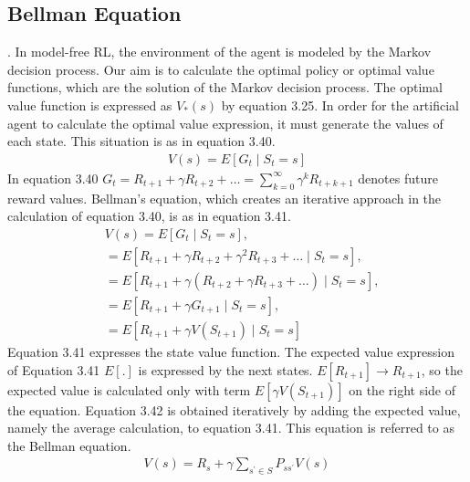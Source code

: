 \documentclass[12pt,twoside,a4]{mwbk}
\begin{document}
\subsection{Bellman Equation}.
In model-free RL, the environment of the agent is modeled by the Markov decision process. Our aim is to calculate the optimal policy or optimal value functions, which are the solution of the Markov decision process. The optimal value function is expressed as $V_{*}(s)$ by equation 3.25. In order for the artificial agent to calculate the optimal value expression, it must generate the values of each state. This situation is as in equation 3.40.
\begin{subequations}
\begin{align}
   V(s)=E\left[G_{t} \mid S_{t}=s\right]
\end{align}
\end{subequations}
In equation 3.40 $G_{t}=R_{t+1}+\gamma R_{t+2}+\ldots=\sum_{k=0}^{\infty} \gamma^{k} R_{t +k+1}$ denotes future reward values. Bellman's equation, which creates an iterative approach in the calculation of equation 3.40, is as in equation 3.41.
\begin{subequations}
\begin{align}
   &V(s)=E\left[G_{t} \mid S_{t}=s\right], \\
    &=E\left[R_{t+1}+\gamma R_{t+2}+\gamma^{2} R_{t+3}+\ldots \mid S_{t}=s\right], \\
    &=E\left[R_{t+1}+\gamma\left(R_{t+2}+\gamma R_{t+3}+\ldots\right) \mid S_{t}=s\right], \\
    &=E\left[R_{t+1}+\gamma G_{t+1} \mid S_{t}=s\right], \\
    &=E\left[R_{t+1}+\gamma V\left(S_{t+1}\right) \mid S_{t}=s\right]
\end{align}
\end{subequations}
Equation 3.41 expresses the state value function. The expected value expression of Equation 3.41 $E[ . ]$ is expressed by the next states. $E\left[R_{t+1}\right] \rightarrow R_{t+1}$, so the expected value is calculated only with term $E\left[\gamma V\left(S_{t+1}\right)\right]$ on the right side of the equation. Equation 3.42 is obtained iteratively by adding the expected value, namely the average calculation, to equation 3.41. This equation is referred to as the Bellman equation.
\begin{subequations}
\begin{align}
   V(s)=R_{s}+\gamma \sum_{s^{\prime} \in S} P_{s s^{\prime}} V(s)
\end{align}
\end{subequations}
\end{document}
